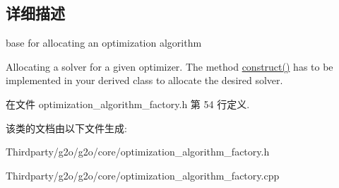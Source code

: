 \subsection{详细描述}
base for allocating an optimization algorithm 

Allocating a solver for a given optimizer. The method \hyperlink{classg2o_1_1AbstractOptimizationAlgorithmCreator_a96a737bda0f932ac7dd51aa468795353}{construct()} has to be implemented in your derived class to allocate the desired solver. 

在文件 optimization\-\_\-algorithm\-\_\-factory.\-h 第 54 行定义.



该类的文档由以下文件生成\-:\begin{DoxyCompactItemize}
\item 
Thirdparty/g2o/g2o/core/optimization\-\_\-algorithm\-\_\-factory.\-h\item 
Thirdparty/g2o/g2o/core/optimization\-\_\-algorithm\-\_\-factory.\-cpp\end{DoxyCompactItemize}
